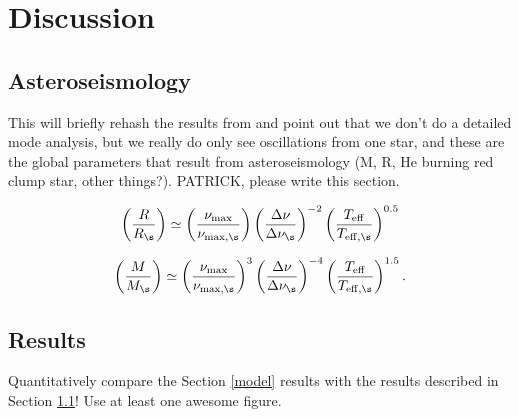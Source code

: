 \section{Discussion}\label{discuss}

\subsection{Asteroseismology}\label{seismo}
This will briefly rehash the results from \citet{gau14} and point out that we don't do a detailed mode analysis, but we really do only see oscillations from one star, and these are the global parameters that result from asteroseismology (M, R, He burning red clump star, other things?). PATRICK, please write this section.

\begin{equation}
\left( \frac{R}{R_\s} \right) \simeq \left( \frac{\nu_{\rm{max}}}{\nu_{\rm{max,\s}}} \right) \left( \frac{\Delta \nu}{\Delta \nu_\s} \right)^{-2} \left( \frac{T_{\rm{eff}}}{T_{\rm{eff,\s}}} \right)^{0.5}
\end{equation}

\begin{equation}
\left( \frac{M}{M_\s} \right) \simeq \left( \frac{\nu_{\rm{max}}}{\nu_{\rm{max,\s}}} \right)^3 \left( \frac{\Delta \nu}{\Delta \nu_\s} \right)^{-4} \left( \frac{T_{\rm{eff}}}{T_{\rm{eff,\s}}} \right)^{1.5}.
\end{equation}



%

\subsection{Results}\label{results}
Quantitatively compare the Section \ref{model} results with the \citet{gau14} results described in Section \ref{seismo}! Use at least one awesome figure.

%
